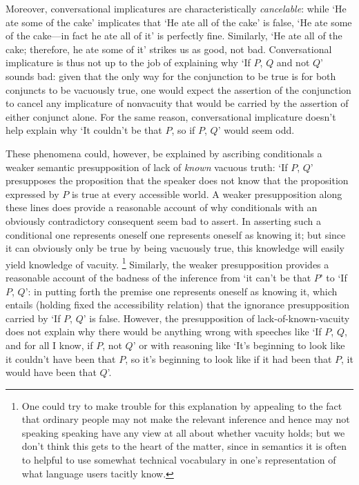 \documentclass[If.tex]{subfiles}
\begin{document}
Moreover, conversational implicatures are characteristically \emph{cancelable}: while ‘He ate some of the cake’ implicates that ‘He ate all of the cake’ is false, ‘He ate some of the cake---in fact he ate all of it’ is perfectly fine.  Similarly, ‘He ate all of the cake; therefore, he ate some of it’ strikes us as good, not bad.  Conversational implicature is thus not up to the job of explaining why ‘If $P$, $Q$ and not $Q$’ sounds bad: given that the only way for the conjunction to be true is for both conjuncts to be vacuously true, one would expect the assertion of the conjunction to cancel any implicature of nonvacuity that would be carried by the assertion of either conjunct alone.  For the same reason, conversational implicature doesn't help explain why ‘It couldn't be that $P$, so if $P$, $Q$’ would seem odd.  



These phenomena could, however, be explained by ascribing conditionals a weaker semantic presupposition of lack of \emph{known} vacuous truth: ‘If $P$, $Q$’ presupposes the proposition that the speaker does not know that the proposition expressed by $P$ is true at every accessible world.  A weaker presupposition along these lines does provide a reasonable account of why conditionals with an obviously contradictory consequent seem bad to assert.  In asserting such a conditional one represents oneself one represents oneself as knowing it; but since it can obviously only be true by being vacuously true, this knowledge will easily yield knowledge of vacuity.%
\footnote{One could try to make trouble for this explanation by appealing to the fact that ordinary people may not make the relevant inference and hence may not speaking speaking have any view at all about whether vacuity holds; but we don't think this gets to the heart of the matter, since in semantics it is often to helpful to use somewhat technical vocabulary in one's representation of what language users tacitly know.}
Similarly, the weaker presupposition provides a reasonable account of the badness of the inference from ‘it can't be that $P$’ to ‘If $P$, $Q$’: in putting forth the premise one represents oneself as knowing it, which entails (holding fixed the accessibility relation) that the ignorance presupposition carried by ‘If $P$, $Q$’ is false.  However, the presupposition of lack-of-known-vacuity does not explain why there would be anything wrong with speeches like ‘If $P$, $Q$, and for all I know, if $P$, not $Q$’ or with reasoning like ‘It's beginning to look like it couldn't have been that $P$, so it's beginning to look like if it had been that $P$, it would have been that $Q$’.  
\end{document}
